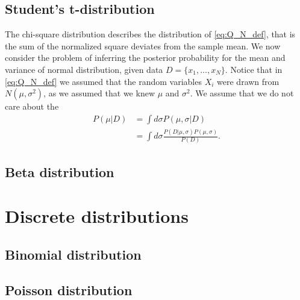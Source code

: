 \subsection{Student's t-distribution}

The chi-square distribution describes the distribution of \eqref{eq:Q_N_def}, that is the sum of the normalized square deviates from the sample mean.
We now consider the problem of inferring the posterior probability for the mean and variance of normal distribution, given data $D=\{x_1,...,x_N\}$. 
Notice that in \eqref{eq:Q_N_def} we assumed that the random variables $X_i$ were drawn from $N\left(\mu,\sigma^2\right)$, as we assumed that we knew $\mu$ and $\sigma^2$. 
We assume that we do not care about the 
\begin{align}
    P\left(\mu|D\right)
    &=
    \int d\sigma P\left(\mu,\sigma|D\right)
    \nonumber\\
    &=
    \int d\sigma \frac{P\left(D|\mu,\sigma\right) P\left(\mu,\sigma\right)}{P\left(D\right)}
    .
\end{align}

\subsection{Beta distribution}
\section{Discrete distributions}
\subsection{Binomial distribution}
\subsection{Poisson distribution}
